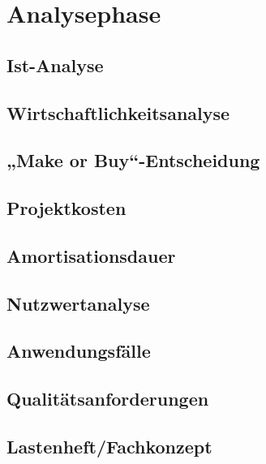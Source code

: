 \section{Analysephase}
\blindtext
\subsection{Ist-Analyse}
\subsection{Wirtschaftlichkeitsanalyse}
\subsection{„Make or Buy“-Entscheidung}
\subsection{Projektkosten}
\subsection{Amortisationsdauer}
\subsection{Nutzwertanalyse}
\subsection{Anwendungsfälle}
\subsection{Qualitätsanforderungen}
\subsection{Lastenheft/Fachkonzept}